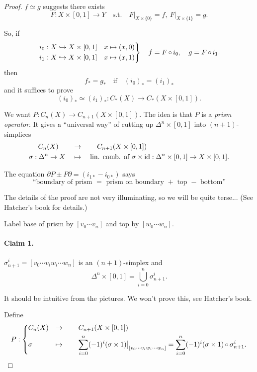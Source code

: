 \documentclass[a4paper,11pt]{article}
\begin{document}
	\begin{proof}
		$f \simeq g$ suggests there exists
		\[
			F : X \times [0,1]\to Y \quad \text{s.t.} \quad F\big|_{X \times \{0\}} = f, \ F\big|_{X \times \{1\}} = g.
		\]
		
		So, if
		\[
			\begin{rcases}
				i_0 : X \hookrightarrow X \times [0,1] & x \mapsto (x,0)\\
				i_1 : X \hookrightarrow X \times [0,1] & x \mapsto (x,1)
			\end{rcases} \quad f = F \operatorname{\circ} i_0, \quad g = F \operatorname{\circ} i_1.
		\]
		then 
		\[
			f_* = g_* \quad \text{if} \quad (i_0)_* = (i_1)_*
		\]
		and it suffices to prove
		\[
			(i_0)_* \simeq (i_1)_* : C_*(X) \to C_*(X\times[0,1]).
		\]
		
		We want $P : C_n(X) \to C _{n+1} (X \times [0,1])$. The idea is that $P$ is a \emph{prism operator}. It gives a ``universal way'' of cutting up $\Delta^n \times [0,1]$ into $(n+1)$-simplices
		\begin{align*}
			C_n(X) \qquad & \to \qquad C _{n+1}(X\times [0,1])\\
			\sigma: \Delta^n \to X \quad& \mapsto \quad \text{lin. comb. of } \sigma \times \operatorname{id} : \Delta^n \times [0,1] \to X \times [0,1].
		\end{align*}
		
		The equation $\partial P \pm P \partial = (i _{1*} - i _{0*})$ says
		\[
			\text{``boundary of prism $=$ prism on boundary $+$ top $-$ bottom''}
		\]


		The details of the proof are not very illuminating, so we will be quite terse... (See Hatcher's book for details.)

		Label base of prism by $[v_0\cdots v_n]$ and top by $[w_0 \cdots w_n]$.

		\paragraph{Claim 1.} $\sigma _{n+1}^i = [v_0 \cdots v_i w_i \cdots w_n]$ is an $(n+1)$-simplex and 
		\[
			\Delta^n \times [0,1] = \bigcup _{i=0}^n \sigma _{n+1}^i.
		\]

		It should be intuitive from the pictures. We won't prove this, see Hatcher's book.

		Define
		\[
			P: \begin{dcases}
				C_n (X)  & \to \qquad C _{n+1} (X \times [0,1])\\
				\sigma  & \mapsto \qquad \sum _{i=0}^n (-1)^i (\sigma \times 1)\big|_{[v_0\cdots v_i w_i\cdots w_n]} = \sum _{i=0}^n (-1)^i (\sigma \times 1) \operatorname{\circ} \sigma _{n+1}^i.
			\end{dcases}
		\]
		

\end{proof}
\end{document}
